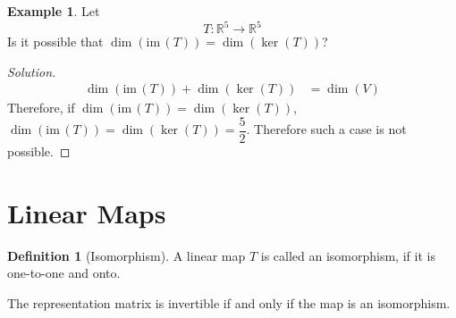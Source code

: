 \documentclass[fleqn, a4paper, 12pt]{article}
\newcommand{\im}{\mathrm{im}\,}
\theoremstyle{definition}
\newtheorem{example}{Example}
\newtheorem{definition}{Definition}
\theoremstyle{theorem}
\newenvironment{solution}
{\begin{proof}[Solution]\let\qed\relax}
	{\end{proof}}
\begin{document}
\begin{example}
	Let
	\begin{equation*}
		T : \mathbb{R}^5 \to \mathbb{R}^5
	\end{equation*}
	Is it possible that $\dim (\im(T)) = \dim (\ker(T))$?
\end{example}

\begin{solution}
	\begin{align*}
		\dim (\im(T)) + \dim (\ker(T)) &= \dim(V)
	\end{align*}
	Therefore, if $\dim (\im(T)) = \dim (\ker(T))$, $\dim (\im(T)) = \dim (\ker(T)) = \dfrac{5}{2}$. Therefore such a case is not possible.
\end{solution}

\section{Linear Maps}

\begin{definition}[Isomorphism]
	A linear map $T$ is called an isomorphism, if it is one-to-one and onto.
\end{definition}

The representation matrix is invertible if and only if the map is an isomorphism.
\end{document}

